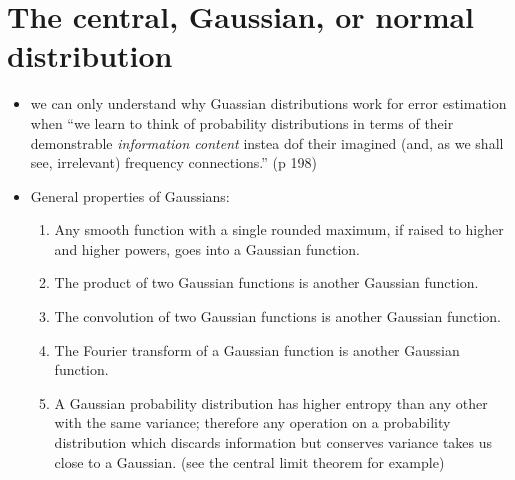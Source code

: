 \documentclass[../jaynes_prob_theory_notes.tex]{subfiles}
\begin{document}
    \section{The central, Gaussian, or normal distribution}
        \begin{itemize}
            \item we can only understand why Guassian distributions work for error estimation when ``we learn to think of probability distributions in terms of their demonstrable \textit{information content} instea dof their imagined (and, as we shall see, irrelevant) frequency connections.'' (p 198)
            \item General properties of Gaussians:
                \begin{enumerate}
                    \item Any smooth function with a single rounded maximum, if raised to higher and higher powers, goes into a Gaussian function.
                    \item The product of two Gaussian functions is another Gaussian function.
                    \item The convolution of two Gaussian functions is another Gaussian function.
                    \item The Fourier transform of a Gaussian function is another Gaussian function.
                    \item A Gaussian probability distribution has higher entropy than any other with the same variance; therefore any operation on a probability distribution which discards information but conserves variance takes us close to a Gaussian. (see the central limit theorem for example)
                \end{enumerate}
        \end{itemize}
\end{document}
